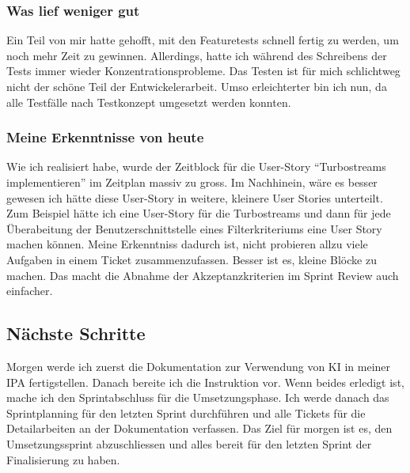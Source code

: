 \subsubsection*{Was lief weniger gut}
Ein Teil von mir hatte gehofft, mit den Featuretests schnell fertig zu werden, um noch mehr Zeit zu gewinnen. Allerdings, hatte ich während des Schreibens der Tests
immer wieder Konzentrationsprobleme. Das Testen ist für mich schlichtweg nicht der schöne Teil der Entwickelerarbeit. Umso erleichterter bin ich nun, 
da alle Testfälle nach Testkonzept umgesetzt werden konnten. 

\subsubsection*{Meine Erkenntnisse von heute}
Wie ich realisiert habe, wurde der Zeitblock für die User-Story ``Turbostreams implementieren'' im Zeitplan massiv zu gross. Im Nachhinein, wäre es 
besser gewesen ich hätte diese User-Story in weitere, kleinere User Stories unterteilt. Zum Beispiel hätte ich 
eine User-Story für die Turbostreams und dann für jede Überabeitung der Benutzerschnittstelle eines Filterkriteriums eine User Story machen können.
Meine Erkenntniss dadurch ist, nicht probieren allzu viele Aufgaben in einem Ticket zusammenzufassen. Besser ist es, kleine Blöcke zu machen.
Das macht die Abnahme der Akzeptanzkriterien im Sprint Review auch einfacher.

\subsection*{Nächste Schritte}
Morgen werde ich zuerst die Dokumentation zur Verwendung von KI in meiner IPA fertigstellen.
Danach bereite ich die Instruktion vor. Wenn beides erledigt ist, mache ich den Sprintabschluss für die Umsetzungsphase. 
Ich werde danach das Sprintplanning für den letzten Sprint durchführen und alle Tickets für die Detailarbeiten an der Dokumentation verfassen.
Das Ziel für morgen ist es, den Umsetzungssprint abzuschliessen und alles bereit für den letzten Sprint der Finalisierung zu haben.

\pagebreak
